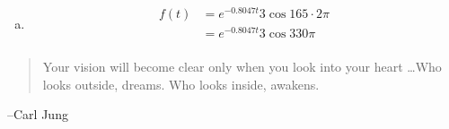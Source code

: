 \documentclass{exam}
\begin{document}
\begin{description}
\begin{enumerate}[(a)]
          \item 
            \begin{align*}
              f(t) & = e^{-0.8047t} 3 \cos 165 \cdot 2 \pi \\
                   & = \boxed{ e^{-0.8047t} 3 \cos 330 \pi } \\
            \end{align*}

        \end{enumerate}

    \end{description}

  \else
    \vspace{10 cm}
    \begin{quote}
      \begin{em}
        Your vision will become clear only when you look into your heart \dots Who looks outside, dreams. Who looks inside, awakens.
      \end{em}
    \end{quote}
    \hspace{1 cm} --Carl Jung
  \fi
\end{document}
